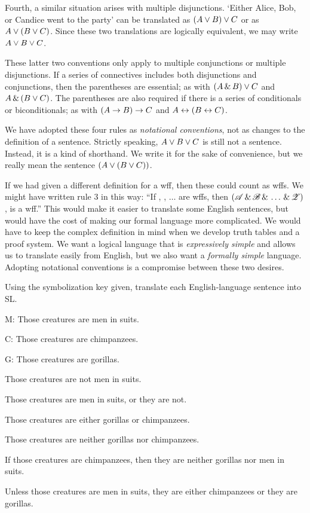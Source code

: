 Fourth, a similar situation arises with multiple disjunctions. `Either Alice, Bob, or Candice went to the party' can be translated as $(A \vee B) \vee C$ or as $A \vee (B \vee C)$. Since these two translations are logically equivalent, we may write $A \vee B \vee C$.

These latter two conventions only apply to multiple conjunctions or multiple  disjunctions. If a series of connectives includes both disjunctions and conjunctions, then the parentheses are essential; as with $(A \,\&\, B) \vee C$ and $A \,\&\, (B \vee C)$. The parentheses are also required if there is a series of conditionals or biconditionals; as with $(A \rightarrow B) \rightarrow C$ and $A \leftrightarrow (B \leftrightarrow C)$.

We have adopted these four rules as \emph{notational conventions}, not as changes to the definition of a sentence. Strictly speaking, $A \vee B \vee C$ is still not a sentence. Instead, it is a kind of shorthand. We write it for the sake of convenience, but we really mean the sentence $(A \vee (B \vee C))$.

If we had given a different definition for a wff, then these could count as wffs. We might have written rule 3 in this way: ``If , , $\ldots$  are wffs, then $(\mathscr{A}\,\&\,\mathscr{B}\,\&\,\ldots\,\&\,\mathscr{Z})$, is a wff.'' This would make it easier to translate some English sentences, but would have the cost of making our formal language more complicated. We would have to keep the complex definition in mind when we develop truth tables and a proof system. We want a logical language that is \emph{expressively simple} and allows us to translate easily from English, but we also want a \emph{formally simple} language. Adopting notational conventions is a compromise between these two desires.



\practiceproblems

\solutions
\problempart Using the symbolization key given, translate each English-language sentence into SL.
\label{pr.monkeysuits}
\begin{ekey}
\item[M:] Those creatures are men in suits. 
\item[C:] Those creatures are chimpanzees. 
\item[G:] Those creatures are gorillas.
\end{ekey}
\begin{earg}
\item Those creatures are not men in suits.
\item Those creatures are men in suits, or they are not.
\item Those creatures are either gorillas or chimpanzees.
\item Those creatures are neither gorillas nor chimpanzees.
\item If those creatures are chimpanzees, then they are neither gorillas nor men in suits.
\item Unless those creatures are men in suits, they are either chimpanzees or they are gorillas.
\end{earg}

